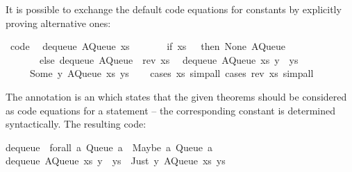 \begin{isabellebody}
\begin{isamarkuptext}
  It is possible to exchange the default code equations for constants
  by explicitly proving alternative ones:%
\end{isamarkuptext}%
\isamarkuptrue%
%
\isadelimquote
%
\endisadelimquote
%
\isatagquote
{}\isamarkupfalse%
\ {\isacharbrackleft}code{\isacharbrackright}{\isacharcolon}\isanewline
\ \ {\isachardoublequoteopen}dequeue\ {\isacharparenleft}AQueue\ xs\ {\isacharbrackleft}{\isacharbrackright}{\isacharparenright}\ {\isacharequal}\isanewline
\ \ \ \ \ {\isacharparenleft}if\ xs\ {\isacharequal}\ {\isacharbrackleft}{\isacharbrackright}\ then\ {\isacharparenleft}None{\isacharcomma}\ AQueue\ {\isacharbrackleft}{\isacharbrackright}\ {\isacharbrackleft}{\isacharbrackright}{\isacharparenright}\isanewline
\ \ \ \ \ \ \ else\ dequeue\ {\isacharparenleft}AQueue\ {\isacharbrackleft}{\isacharbrackright}\ {\isacharparenleft}rev\ xs{\isacharparenright}{\isacharparenright}{\isacharparenright}{\isachardoublequoteclose}\isanewline
\ \ {\isachardoublequoteopen}dequeue\ {\isacharparenleft}AQueue\ xs\ {\isacharparenleft}y\ {\isacharhash}\ ys{\isacharparenright}{\isacharparenright}\ {\isacharequal}\isanewline
\ \ \ \ \ {\isacharparenleft}Some\ y{\isacharcomma}\ AQueue\ xs\ ys{\isacharparenright}{\isachardoublequoteclose}\isanewline
\ \ \isamarkupfalse%
\ {\isacharparenleft}cases\ xs{\isacharcomma}\ simp{\isacharunderscore}all{\isacharparenright}\ {\isacharparenleft}cases\ {\isachardoublequoteopen}rev\ xs{\isachardoublequoteclose}{\isacharcomma}\ simp{\isacharunderscore}all{\isacharparenright}%
\endisatagquote
{\isafoldquote}%
%
\isadelimquote
%
\endisadelimquote
%
\begin{isamarkuptext}%
\noindent The annotation  is an 
  which states that the given theorems should be considered as code
  equations for a  statement -- the corresponding constant
  is determined syntactically.  The resulting code:%
\end{isamarkuptext}%
\isamarkuptrue%
%
\isadelimquote
%
\endisadelimquote
%
\isatagquote
%
\begin{isamarkuptext}%
\begin{typewriter}
    dequeue\ {\isacharcolon}{\isacharcolon}\ forall\ a{\isachardot}\ Queue\ a\ {\isacharminus}{\isachargreater}\ {\isacharparenleft}Maybe\ a{\isacharcomma}\ Queue\ a{\isacharparenright}{\isacharsemicolon}\isanewline
dequeue\ {\isacharparenleft}AQueue\ xs\ {\isacharparenleft}y\ {\isacharcolon}\ ys{\isacharparenright}{\isacharparenright}\ {\isacharequal}\ {\isacharparenleft}Just\ y{\isacharcomma}\ AQueue\ xs\ ys{\isacharparenright}{\isacharsemicolon}\isanewline

\end{typewriter}
\end{isamarkuptext}
\end{isabellebody}
